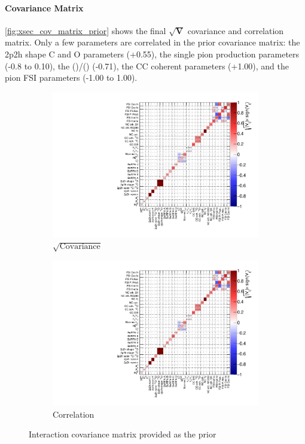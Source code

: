 \paragraph{Covariance Matrix}
\autoref{fig:xsec_cov_matrix_prior} shows the final $\sqrt{\textbf{V}}$ covariance and correlation matrix. Only a few parameters are correlated in the prior covariance matrix: the 2p2h shape C and O parameters (+0.55), the single pion production parameters (-0.8 to 0.10), the \nue(\nuebar)/\numu(\numubar) (-0.71), the CC coherent parameters (+1.00), and the pion FSI parameters (-1.00 to 1.00).
\begin{figure}[h]
	\begin{subfigure}[t]{0.49\textwidth}
		\includegraphics[width=\textwidth, trim={0mm 0mm 0mm 0mm}, clip, page=1] {figures/niwg/xsec_covariance_2017b_NOMINAL_v1_xseccov}
		\caption{$\sqrt{\text{Covariance}}$}
		\label{fig:xsec_cov_matrix_vij}
	\end{subfigure}
	\begin{subfigure}[t]{0.49\textwidth}
		\includegraphics[width=\textwidth, trim={0mm 0mm 0mm 0mm}, clip, page=2] {figures/niwg/xsec_covariance_2017b_NOMINAL_v1_xseccov}
		\caption{Correlation}
	\end{subfigure}
	\caption{Interaction covariance matrix provided as the prior}
	\label{fig:xsec_cov_matrix_prior}
\end{figure}

